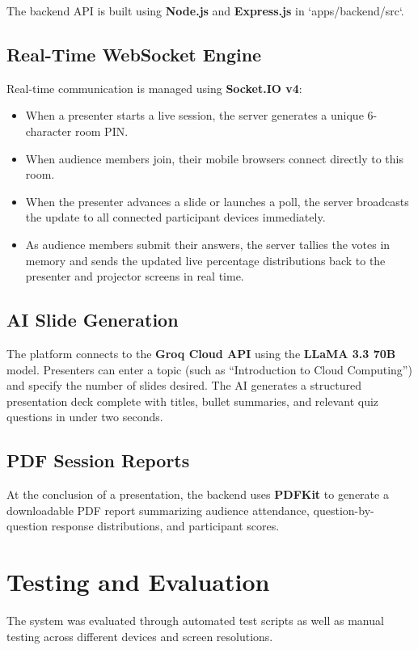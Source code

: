 The backend API is built using \textbf{Node.js} and \textbf{Express.js} in `apps/backend/src`.

\subsection{Real-Time WebSocket Engine}
Real-time communication is managed using \textbf{Socket.IO v4}:
\begin{itemize}
    \item When a presenter starts a live session, the server generates a unique 6-character room PIN.
    \item When audience members join, their mobile browsers connect directly to this room.
    \item When the presenter advances a slide or launches a poll, the server broadcasts the update to all connected participant devices immediately.
    \item As audience members submit their answers, the server tallies the votes in memory and sends the updated live percentage distributions back to the presenter and projector screens in real time.
\end{itemize}

\subsection{AI Slide Generation}
The platform connects to the \textbf{Groq Cloud API} using the \textbf{LLaMA 3.3 70B} model. Presenters can enter a topic (such as ``Introduction to Cloud Computing'') and specify the number of slides desired. The AI generates a structured presentation deck complete with titles, bullet summaries, and relevant quiz questions in under two seconds.

\subsection{PDF Session Reports}
At the conclusion of a presentation, the backend uses \textbf{PDFKit} to generate a downloadable PDF report summarizing audience attendance, question-by-question response distributions, and participant scores.

\section{Testing and Evaluation}

The system was evaluated through automated test scripts as well as manual testing across different devices and screen resolutions.

